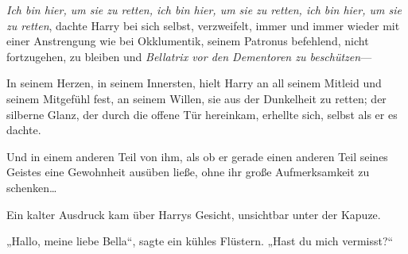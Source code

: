 \emph{Ich bin hier, um sie zu retten, ich bin hier, um sie zu retten, ich bin hier, um sie zu retten}, dachte Harry bei sich selbst, verzweifelt, immer und immer wieder mit einer Anstrengung wie bei Okklumentik, seinem Patronus befehlend, nicht fortzugehen, zu bleiben und \emph{Bellatrix vor den Dementoren zu beschützen}—

In seinem Herzen, in seinem Innersten, hielt Harry an all seinem Mitleid und seinem Mitgefühl fest, an seinem Willen, sie aus der Dunkelheit zu retten; der silberne Glanz, der durch die offene Tür hereinkam, erhellte sich, selbst als er es dachte.

Und in einem anderen Teil von ihm, als ob er gerade einen anderen Teil seines Geistes eine Gewohnheit ausüben ließe, ohne ihr große Aufmerksamkeit zu schenken…

Ein kalter Ausdruck kam über Harrys Gesicht, unsichtbar unter der Kapuze.

„Hallo, meine liebe Bella“, sagte ein kühles Flüstern. „Hast du mich vermisst?“

